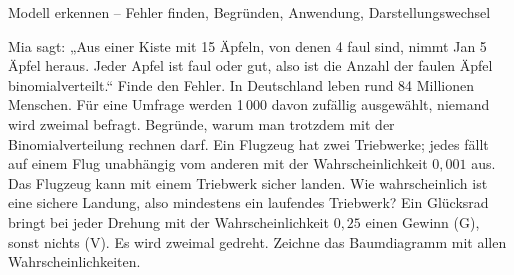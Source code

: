 \begin{aufgabe}{Modell erkennen – Fehler finden, Begründen, Anwendung, Darstellungswechsel}
\begin{teile}
\teil Mia sagt: „Aus einer Kiste mit 15 Äpfeln, von denen 4 faul sind, nimmt Jan 5 Äpfel heraus. Jeder Apfel ist faul oder gut, also ist die Anzahl der faulen Äpfel binomialverteilt.“ Finde den Fehler.
\teil In Deutschland leben rund 84 Millionen Menschen. Für eine Umfrage werden 1\,000 davon zufällig ausgewählt, niemand wird zweimal befragt. Begründe, warum man trotzdem mit der Binomialverteilung rechnen darf.
\teil Ein Flugzeug hat zwei Triebwerke; jedes fällt auf einem Flug unabhängig vom anderen mit der Wahrscheinlichkeit $0{,}001$ aus. Das Flugzeug kann mit einem Triebwerk sicher landen. Wie wahrscheinlich ist eine sichere Landung, also mindestens ein laufendes Triebwerk?
\teil Ein Glücksrad bringt bei jeder Drehung mit der Wahrscheinlichkeit $0{,}25$ einen Gewinn (G), sonst nichts (V). Es wird zweimal gedreht. Zeichne das Baumdiagramm mit allen Wahrscheinlichkeiten.

\end{teile}
\end{aufgabe}
